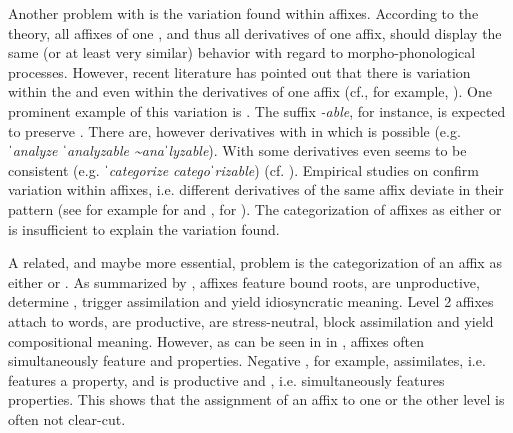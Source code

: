 Another problem with  is the variation found within affixes. According to the theory, all affixes of one , and thus all derivatives of one affix, should display the same (or at least very similar) behavior with regard to morpho-phonological processes. However, recent literature has pointed out that there is variation within the  and even within the derivatives of one affix (cf., for example, \citealt{Raffelsiefen.1999,Bauer.2013, Plag.2014, BermudezOtero.2017}).  One prominent example of this variation is . The suffix \textit{-able}, for instance, is expected to preserve . There are, however derivatives with  in which  is possible (e.g. \textit{ˈanalyze \textendash ˈanalyzable \textasciitilde anaˈlyzable}). With some derivatives  even seems to  be consistent (e.g. \textit{ˈcategorize \textendash categoˈrizable}) (cf. \citealt[213 f.]{Plag.2014}). Empirical studies on  confirm variation within affixes, i.e. different derivatives of the same affix deviate in their  pattern (see for example \citealt{Collie.2008} for  and , \citealt{Sanz.2017} for ). The categorization of affixes as either  or  is insufficient to explain the variation found. 

A related, and maybe more essential, problem is the categorization of an affix as either  or . As summarized by \citet[134]{Raffelsiefen.1999},  affixes feature bound roots, are unproductive, determine , trigger assimilation and yield idiosyncratic meaning. Level 2 affixes attach to words, are productive, are stress-neutral, block assimilation and yield compositional meaning. However, as can be seen in  in , affixes often simultaneously feature  and  properties. Negative , for example, assimilates, i.e. features a  property, and is productive and , i.e. simultaneously features  properties. This shows that the assignment of an affix to one or the other level is often not clear-cut. 

